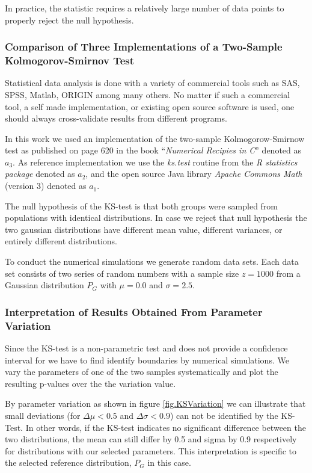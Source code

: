\documentclass[a4paper,10pt]{scrbook}
\begin{document}
In practice, the statistic requires a relatively large number of data points to properly reject the null hypothesis.

\subsubsection*{Comparison of Three Implementations of a Two-Sample Kolmogorov-Smirnov Test}

Statistical data analysis is done with a variety of commercial tools such as SAS, SPSS, Matlab, ORIGIN among many others. No matter if such a commercial tool, a self made implementation, or existing open source software is used, one should always cross-validate results from different programs.

In this work we used an implementation of the two-sample Kolmogorow-Smirnow test as published on page 620 in the book “\textit{Numerical Recipies in C}” \cite{NRC} denoted as $a_3$. As reference implementation we use the \textit{ks.test} routine from the \textit{R statistics package} \cite{RstatisticalSW} denoted as $a_2$, and the open source Java library \textit{Apache Commons Math} (version 3) \cite{ACM3} denoted as $a_1$. 

The null hypothesis of the KS-test is that both groups were sampled from populations with identical distributions. In case we reject that null hypothesis the two gaussian distributions have different mean value, different variances, or entirely different distributions. 

To conduct the numerical simulations we generate random data sets. Each data set consists of two series of random numbers with a sample size $z=1000$ from a Gaussian distribution $P_G$ with $\mu=0.0$ and $\sigma=2.5$. 

\subsubsection*{Interpretation of Results Obtained From Parameter Variation}
Since the KS-test is a non-parametric test and does not provide a confidence interval for we have to find identify boundaries by numerical simulations. We vary the parameters of one of the two samples systematically and plot the resulting p-values over the the variation value.

\label{ext.fig.KSVariation} 


By parameter variation as shown in figure \ref{fig.KSVariation} we can illustrate that small deviations (for $\Delta \mu < 0.5$ and $\Delta \sigma < 0.9$) can not be identified by the KS-Test. In other words, if the KS-test indicates no significant difference between the two distributions, the mean can still differ by 0.5 and sigma by 0.9 respectively for distributions with our selected parameters. This interpretation is specific to the selected reference distribution, $P_G$ in this case. 
\end{document}
